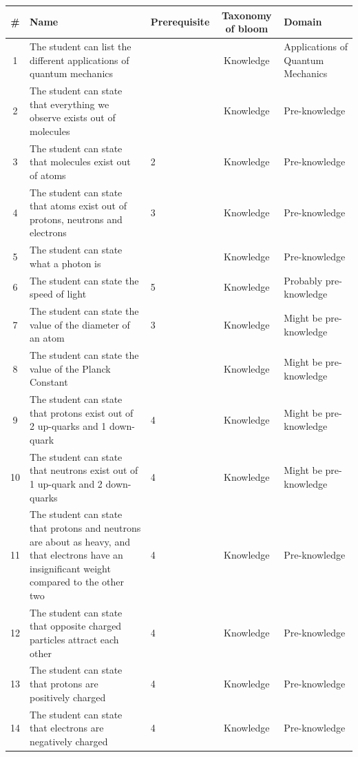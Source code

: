 \documentclass[11pt,twoside]{report} %
\begin{document}
\begin{table}[htbp]
\small
\begin{center}
\begin{tabular}{|c|p{5cm}|p{1.5cm}|c|p{3cm}|}
\hline
\textbf{\#} & \textbf{Name} & \textbf{\footnotesize Prerequisite} & \textbf{Taxonomy of bloom} & \textbf{Domain} \\ \hline
1 & The student can list the different applications of quantum mechanics &  & Knowledge & Applications of Quantum Mechanics \\ \hline
2 & The student can state that everything we observe exists out of molecules &  & Knowledge & Pre-knowledge \\ \hline
3 & The student can state that molecules exist out of atoms & 2 & Knowledge & Pre-knowledge \\ \hline
4 & The student can state that atoms exist out of protons, neutrons and electrons & 3 & Knowledge & Pre-knowledge \\ \hline
5 & The student can state what a photon is &  & Knowledge & Pre-knowledge \\ \hline
6 & The student can state the speed of light & 5 & Knowledge & Probably pre-knowledge \\ \hline
7 & The student can state the value of the diameter of an atom & 3 & Knowledge & Might be pre-knowledge \\ \hline
8 & The student can state the value of the Planck Constant &  & Knowledge & Might be pre-knowledge \\ \hline
9 & The student can state that protons exist out of 2 up-quarks and 1 down-quark & 4 & Knowledge & Might be pre-knowledge \\ \hline
10 & The student can state that neutrons exist out of 1 up-quark and 2 down-quarks & 4 & Knowledge & Might be pre-knowledge \\ \hline
11 & The student can state that protons and neutrons are about as heavy, and that electrons have an insignificant weight compared to the other two & 4 & Knowledge & Pre-knowledge \\ \hline
12 & The student can state that opposite charged particles attract each other & 4 & Knowledge & Pre-knowledge \\ \hline
13 & The student can state that protons are positively charged & 4 & Knowledge & Pre-knowledge \\ \hline
14 & The student can state that electrons are negatively charged & 4 & Knowledge & Pre-knowledge \\ \hline
\end{tabular}
\end{center}
\label{completeoutline}
\end{table}
\end{document}
